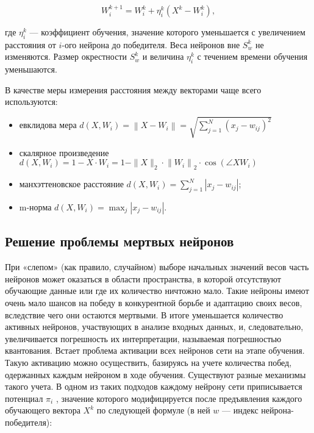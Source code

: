 \begin{equation}
	W_{i}^{k+1} = W_{i}^{k}+\eta_{i}^{k}\left(X^{k}-W_{i}^{k}\right) ,
\end{equation}

где $\eta^k_i$ --- коэффициент обучения, значение которого уменьшается с увеличением расстояния от $i$-ого нейрона до победителя. Веса нейронов вне $S^k_w$ не изменяются. Размер окрестности $S^k_w$ и величина $\eta^k_i$ с течением времени обучения уменьшаются.

В качестве меры измерения расстояния между векторами чаще всего
используются:
\begin{itemize}
\item евклидова мера $d \left( X , W _ { i } \right) = \left\| X - W _ { i } \right\| = \sqrt { \sum _ { j = 1 } ^ { N } \left( x _ { j } - w _ { i j } \right) ^ { 2 } }$
\item скалярное произведение
$d \left( X , W _ { i } \right) = 1 - X \cdot W _ { i } = 1 - \| X \| _ { 2 } \cdot \left\| W _ { i } \right\| _ { 2 } \cdot \cos \left( \angle X W _ { i } \right)$

\item манхэттеновское расстояние $d \left( X , W _ { i } \right) = \sum _ { j = 1 } ^ { N } \left| x _ { j } - w _ { i j } \right|$;

\item m-норма $d \left( X , W _ { i } \right) = \max _ { j } \left| x _ { j } - w _ { i j } \right|$.
\end{itemize}

\subsection{Решение проблемы мертвых нейронов}
\label{seq:deadNeurons}
При «слепом» (как правило, случайном) выборе начальных значений весов
часть нейронов может оказаться в области пространства, в которой
отсутствуют обучающие данные или где их количество ничтожно мало.
Такие нейроны имеют очень мало шансов на победу в конкурентной
борьбе и адаптацию своих весов, вследствие чего они остаются мертвыми.
В итоге уменьшается количество активных нейронов, участвующих
в анализе входных данных, и, следовательно, увеличивается погрешность
их интерпретации, называемая погрешностью квантования. Встает проблема
активации всех нейронов сети на этапе обучения.
Такую активацию можно осуществить, базируясь на учете количества
побед, одержанных каждым нейроном в ходе обучения. Существуют
разные механизмы такого учета.
В одном из таких подходов каждому нейрону сети приписывается
потенциал $\pi_i$
, значение которого модифицируется после предъявления
каждого обучающего вектора $X^k$ по следующей формуле (в ней $w$ —
индекс нейрона-победителя):

